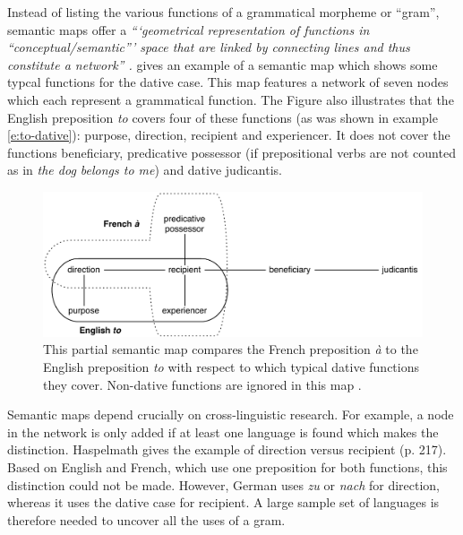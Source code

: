 Instead of listing the various functions of a grammatical morpheme or ``gram'', semantic maps offer a {\em ```geometrical representation of functions in ``conceptual/semantic''' space that are linked by connecting lines and thus constitute a network'' \citep[p. 213]{haspelmath03geometry}.}  gives an example of a semantic map which shows some typcal functions for the dative case. This map features a network of seven nodes which each represent a grammatical function. The Figure also illustrates that the English preposition {\em to} covers four of these functions (as was shown in example \ref{e:to-dative}): purpose, direction, recipient and experiencer. It does not cover the functions beneficiary, predicative possessor (if prepositional verbs are not counted as in {\em the dog belongs to me}) and dative judicantis.
\begin{figure}[t]
\centerline{\includegraphics[width=\textwidth]{Chapter5/figs/semmap-to}}
  \caption[A semantic map of dative functions for {\em to} \citep{haspelmath03geometry}]{This partial semantic map compares the French preposition {\em à} to the English preposition {\em to} with respect to which typical dative functions they cover. Non-dative functions are ignored in this map \citep[adapted from][figures 8.1 and 8.2, p. 213 and 215]{haspelmath03geometry}.}
   \label{f:semmap-to}
\end{figure}

Semantic maps depend crucially on cross-linguistic research. For example, a node in the network is only added if at least one language is found which makes the distinction. Haspelmath gives the example of direction versus recipient (p. 217). Based on English and French, which use one preposition for
both functions, this distinction could not be made. However, German uses {\em zu} or {\em nach} for direction, whereas it uses the dative case for recipient. A large sample set of languages is therefore needed to uncover all the uses of a gram.

